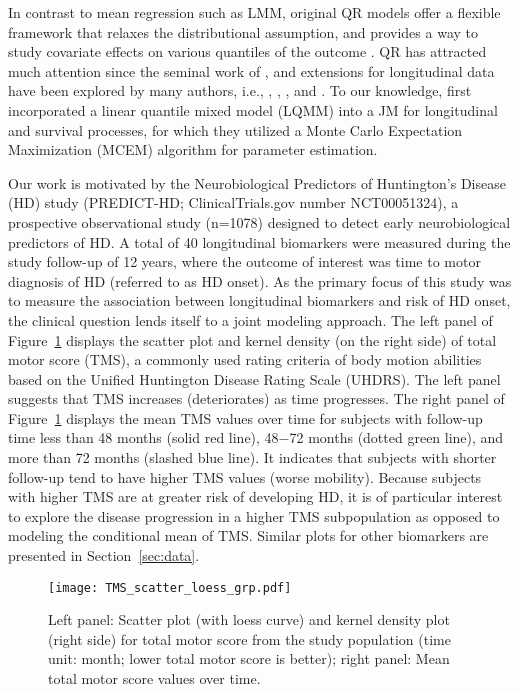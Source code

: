 In contrast to mean regression such as LMM, original QR models offer a flexible framework that relaxes the distributional assumption, and provides a way to study covariate effects on various quantiles of the outcome \citep{koenker2005quantile}. QR has attracted much attention since the seminal work of \cite{koenker1978regression}, and extensions for longitudinal data have been explored by many authors, i.e., \cite{koenker2004quantile}, \cite{geraci2007quantile}, \cite{geraci2013linear}, and \cite{kozumi2011gibbs}. To our knowledge, \cite{farcomeni2015longitudinal} first incorporated a linear quantile mixed model (LQMM) into a JM for longitudinal and survival processes, for which they utilized a Monte Carlo Expectation Maximization (MCEM) algorithm for parameter estimation.

Our work is motivated by the Neurobiological Predictors of Huntington's Disease (HD) study (PREDICT-HD; ClinicalTrials.gov number NCT00051324), a prospective observational study (n=1078) designed to detect early neurobiological predictors of HD. A total of 40 longitudinal biomarkers were measured during the study follow-up of 12 years, where the outcome of interest was time to motor diagnosis of HD (referred to as HD onset). As the primary focus of this study was to measure the association between longitudinal biomarkers and risk of HD onset, the clinical question lends itself to a joint modeling approach. The left panel of Figure~\ref{fig:data_neurotot} displays the scatter plot and kernel density (on the right side) of total motor score (TMS), a commonly used rating criteria of body motion abilities based on the Unified Huntington Disease Rating Scale (UHDRS). The left panel suggests that TMS increases (deteriorates) as time progresses. The right panel of Figure~\ref{fig:data_neurotot} displays the mean TMS values over time for subjects with follow-up time less than 48 months (solid red line), 48$-$72 months (dotted green line), and more than 72 months (slashed blue line). It indicates that subjects with shorter follow-up tend to have higher TMS values (worse mobility). Because subjects with higher TMS are at greater risk of developing HD, it is of particular interest to explore the disease progression in a higher TMS subpopulation as opposed to modeling the conditional mean of TMS. Similar plots for other biomarkers are presented in Section~\ref{sec:data}.

\begin{figure}[H]
\centering
\texttt{[image: TMS\_scatter\_loess\_grp.pdf]}
\caption{Left panel: Scatter plot (with loess curve) and kernel density plot (right side) for {total motor score} from the study population (time unit: month; lower total motor score is better); right panel: Mean total motor score values over time.}
\label{fig:data_neurotot}
\end{figure}

